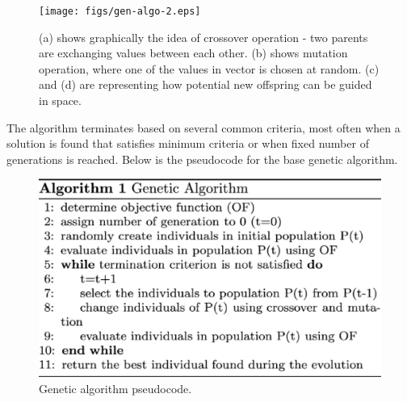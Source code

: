 \documentclass[11pt,a4paper,openany]{book}
\begin{document}
 \begin{figure}[ht!]
     \centering
     \texttt{[image: figs/gen-algo-2.eps]}
     \caption{(a) shows graphically the idea of crossover operation - two parents are exchanging values between each other.  (b) shows mutation operation, where one of the values in vector is chosen at random. (c) and (d) are representing how potential new offspring can be guided in space. \cite{de}}\label{Fig:PROGAN}
 \end{figure}
 
\noindent The algorithm terminates based on several common criteria, most often when a solution is found that satisfies minimum criteria or when fixed number of generations is reached. Below is the pseudocode for the base genetic algorithm. 

 \begin{figure}[H]
     \centering
     \includegraphics[scale=0.5]{figs/gen-algo-pseudo.eps}
     \caption{Genetic algorithm pseudocode. \cite{coimbra}}\label{Fig:PROGAN}
 \end{figure}

% 

\end{document}
